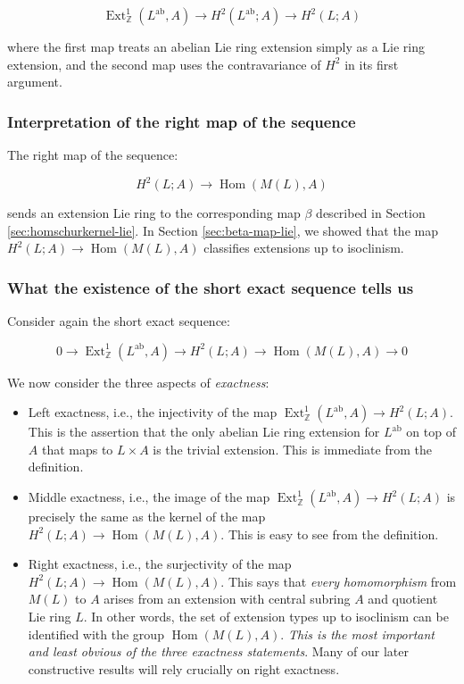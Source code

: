 $$\operatorname{Ext}^1_{\mathbb{Z}}(L^{\operatorname{ab}},A) \to H^2(L^{\operatorname{ab}};A) \to H^2(L;A)$$

where the first map treats an abelian Lie ring extension simply as a
Lie ring extension, and the second map uses the contravariance of $H^2$
in its first argument.

\subsubsection{Interpretation of the right map of the sequence}\label{sec:ses-uct-lie-right-map}

The right map of the sequence:

$$H^2(L;A) \to \operatorname{Hom}(M(L),A)$$

sends an extension Lie ring to the corresponding map $\beta$ described in
Section \ref{sec:homschurkernel-lie}. In Section \ref{sec:beta-map-lie}, we
showed that the map $H^2(L;A) \to \operatorname{Hom}(M(L),A)$
classifies extensions up to isoclinism.

\subsubsection{What the existence of the short exact sequence tells us}

Consider again the short exact sequence:

\begin{equation*}
  0 \to \operatorname{Ext}^1_{\mathbb{Z}}(L^{\operatorname{ab}},A) \to H^2(L;A) \to \operatorname{Hom}(M(L),A) \to 0
\end{equation*}

We now consider the three aspects of {\em exactness}:

\begin{itemize}
\item Left exactness, i.e., the injectivity of the map
  $\operatorname{Ext}^1_{\mathbb{Z}}(L^{\operatorname{ab}},A) \to
  H^2(L;A)$. This is the assertion that the only abelian Lie ring
  extension for $L^{\operatorname{ab}}$ on top of $A$ that maps to $L
  \times A$ is the trivial extension. This is immediate from the
  definition.
\item Middle exactness, i.e., the image of the map
  $\operatorname{Ext}^1_{\mathbb{Z}}(L^{\operatorname{ab}},A) \to
  H^2(L;A)$ is precisely the same as the kernel of the map $ H^2(L;A)
  \to \operatorname{Hom}(M(L),A)$. This is easy to see from the
  definition.
\item Right exactness, i.e., the surjectivity of the map $H^2(L;A) \to
  \operatorname{Hom}(M(L),A)$. This says that {\em every homomorphism}
  from $M(L)$ to $A$ arises from an extension with central subring
  $A$ and quotient Lie ring $L$. In other words, the set of extension
  types up to isoclinism can be identified with the group
  $\operatorname{Hom}(M(L),A)$. {\em This is the most important and
    least obvious of the three exactness statements}. Many of our
  later constructive results will rely crucially on right exactness.
\end{itemize}

